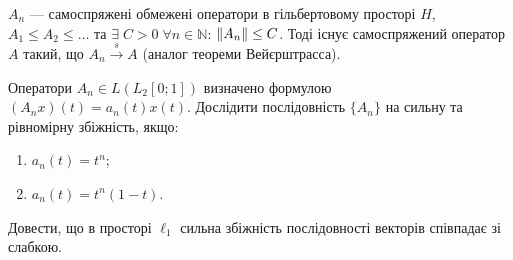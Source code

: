 \begin{exercise}\label{N:1_4_28}
    $A_n$ --- самоспряжені обмежені оператори в гільбертовому просторі $H$,
    $A_1 \leq A_2 \leq \dots$ та $\exists \; C > 0 \; \forall n \in \mathbb{N}$: $\left\lVert A_n\right\rVert\leq C$.
    Тоді існує самоспряжений оператор $A$ такий, що $A_n \overset{s}{\to} A$
    (аналог теореми Вейєрштрасса).
\end{exercise}

\begin{exercise}
    Оператори $A_n \in L(L_2[0;1])$ визначено формулою $(A_n x)(t) = a_n(t) x(t)$.
    Дослідити послідовність $\{A_n\}$ на сильну та рівномірну збіжність, якщо:
    \begin{enumerate}
        \item $a_n(t) = t^n$;
        \item $a_n(t) = t^n (1-t)$.
    \end{enumerate}
\end{exercise}

\begin{exercise*}
    Довести, що в просторі $\ell_1$ сильна збіжність послідовності векторів співпадає зі слабкою.
\end{exercise*}
